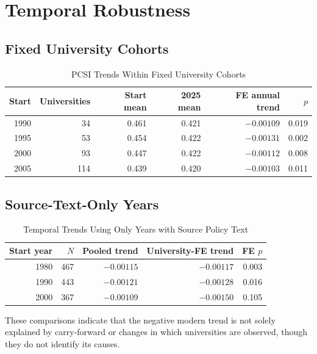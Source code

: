 \documentclass[11pt]{article}
\begin{document}
\section{Temporal Robustness}
\subsection{Fixed University Cohorts}
\begin{table}[htbp]\centering\caption{PCSI Trends Within Fixed University Cohorts}\small\begin{tabular}{rrrrrr}\toprule Start&Universities&Start mean&2025 mean&FE annual trend&$p$\\\midrule 1990&34&0.461&0.421&$-0.00109$&0.019\\1995&53&0.454&0.422&$-0.00131$&0.002\\2000&93&0.447&0.422&$-0.00112$&0.008\\2005&114&0.439&0.420&$-0.00103$&0.011\\\bottomrule\end{tabular}\end{table}
\subsection{Source-Text-Only Years}
\begin{table}[htbp]\centering\caption{Temporal Trends Using Only Years with Source Policy Text}\small\begin{tabular}{rrrrr}\toprule Start year&$N$&Pooled trend&University-FE trend&FE $p$\\\midrule 1980&467&$-0.00115$&$-0.00117$&0.003\\1990&443&$-0.00121$&$-0.00128$&0.016\\2000&367&$-0.00109$&$-0.00150$&0.105\\\bottomrule\end{tabular}\end{table}
These comparisons indicate that the negative modern trend is not solely explained by carry-forward or changes in which universities are observed, though they do not identify its causes.

\clearpage
{}
\end{document}
